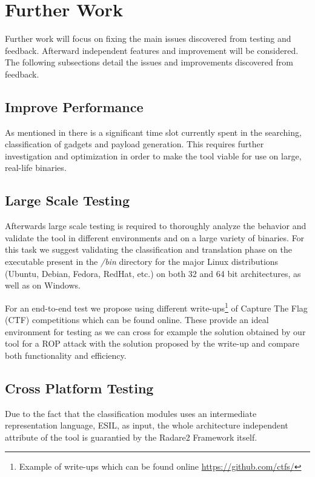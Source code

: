 \section{Further Work}

Further work will focus on fixing the main issues discovered from testing and feedback. Afterward independent features and improvement will be considered. The following subsections detail the issues and improvements discovered from feedback.

\subsection{Improve Performance}

As mentioned in  there is a significant time slot currently spent in the searching, classification of gadgets and payload generation. This requires further investigation and optimization in order to make the tool viable for use on large, real-life binaries.

\subsection{Large Scale Testing}

Afterwards large scale testing is required to thoroughly analyze the behavior and validate the tool in different environments and on a large variety of binaries. For this task we suggest validating the classification and translation phase on the executable present in the \textit{/bin} directory for the major Linux distributions (Ubuntu, Debian, Fedora, RedHat, etc.) on both 32 and 64 bit architectures, as well as on Windows.

For an end-to-end test we propose using different write-ups\footnote{Example of write-ups which can be found online \url{https://github.com/ctfs/}} of Capture The Flag (CTF) competitions which can be found online. These provide an ideal environment for testing as we can cross for example the solution obtained by our tool for a ROP attack with the solution proposed by the write-up and compare both functionality and efficiency.

\subsection{Cross Platform Testing}

Due to the fact that the classification modules uses an intermediate representation language, ESIL, as input, the whole architecture independent attribute of the tool is guarantied by the Radare2 Framework itself.

